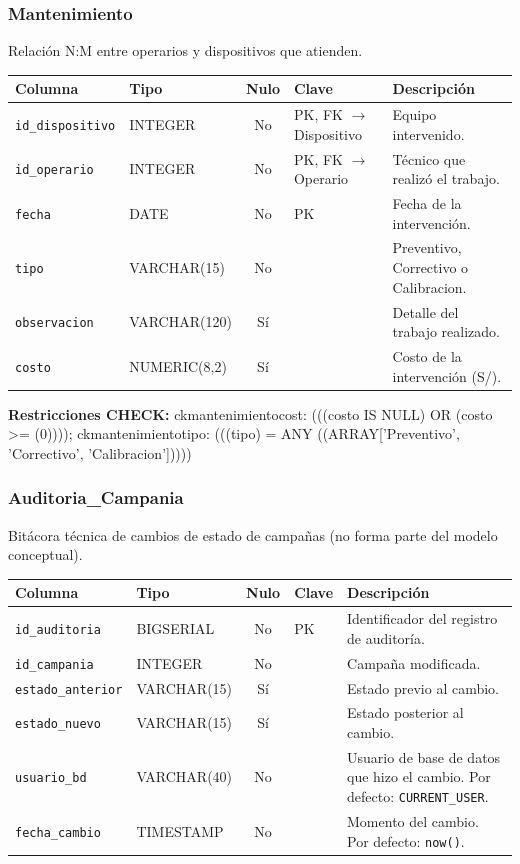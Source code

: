 \documentclass[11pt,letterpaper]{article}
\newcommand{\tbus}{\textunderscore\allowbreak}
\newcommand{\tb}[1]{{\ttfamily\let\_\tbus #1}}
\begin{document}
\subsubsection*{Mantenimiento}
Relación N:M entre operarios y dispositivos que atienden.
{\footnotesize
\begin{longtable}{>{\raggedright\arraybackslash}p{3.3cm}>{\raggedright\arraybackslash}p{2.5cm}c>{\raggedright\arraybackslash}p{2.2cm}>{\raggedright\arraybackslash}p{6.1cm}}
\toprule
\textbf{Columna} & \textbf{Tipo} & \textbf{Nulo} & \textbf{Clave} & \textbf{Descripción} \\
\midrule
\endhead
\texttt{id\_dispositivo} & INTEGER & No & PK, FK $\to$ Dispositivo & Equipo intervenido. \\
\texttt{id\_operario} & INTEGER & No & PK, FK $\to$ Operario & Técnico que realizó el trabajo. \\
\texttt{fecha} & DATE & No & PK & Fecha de la intervención. \\
\texttt{tipo} & VARCHAR(15) & No &  & Preventivo, Correctivo o Calibracion. \\
\texttt{observacion} & VARCHAR(120) & Sí &  & Detalle del trabajo realizado. \\
\texttt{costo} & NUMERIC(8,2) & Sí &  & Costo de la intervención (S/). \\
\bottomrule
\end{longtable}}
{\footnotesize\raggedright\textbf{Restricciones CHECK:} \tb{ck\_mantenimiento\_cost}: \tb{(((costo IS NULL) OR (costo >= (0))))}; \tb{ck\_mantenimiento\_tipo}: \tb{(((tipo) = ANY ((ARRAY['Preventivo', 'Correctivo', 'Calibracion']))))}\par}
\medskip
\subsubsection*{Auditoria\_Campania}
Bitácora técnica de cambios de estado de campañas (no forma parte del modelo conceptual).
{\footnotesize
\begin{longtable}{>{\raggedright\arraybackslash}p{3.3cm}>{\raggedright\arraybackslash}p{2.5cm}c>{\raggedright\arraybackslash}p{2.2cm}>{\raggedright\arraybackslash}p{6.1cm}}
\toprule
\textbf{Columna} & \textbf{Tipo} & \textbf{Nulo} & \textbf{Clave} & \textbf{Descripción} \\
\midrule
\endhead
\texttt{id\_auditoria} & BIGSERIAL & No & PK & Identificador del registro de auditoría. \\
\texttt{id\_campania} & INTEGER & No &  & Campaña modificada. \\
\texttt{estado\_anterior} & VARCHAR(15) & Sí &  & Estado previo al cambio. \\
\texttt{estado\_nuevo} & VARCHAR(15) & Sí &  & Estado posterior al cambio. \\
\texttt{usuario\_bd} & VARCHAR(40) & No &  & Usuario de base de datos que hizo el cambio. Por defecto: \texttt{CURRENT\_USER}. \\
\texttt{fecha\_cambio} & TIMESTAMP & No &  & Momento del cambio. Por defecto: \texttt{now()}. \\
\bottomrule
\end{longtable}}
\end{document}
